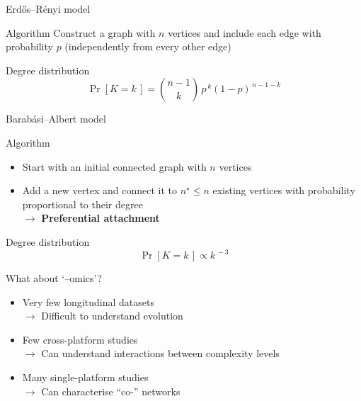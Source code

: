 \begin{frame}{Erdős--Rényi model}
    \begin{block}{Algorithm}
        Construct a graph with $n$ vertices and include each edge with
        probability $p$ (independently from every other edge)
    \end{block}
    \vfill\pause
    \begin{block}{Degree distribution}
        \[
            \Pr\left[ K = k \,\right] = \binom{n-1}{k} \, p^{\,k} \left( 1-p \right)^{\,n-1-k}
        \]
    \end{block}
\end{frame}

\begin{frame}{Barabási--Albert model}
    \begin{block}{Algorithm}
        \begin{itemize}
            \item Start with an initial connected graph with $n$ vertices
            \item Add a new vertex and connect it to $n^{\star} \leq n$ existing
                  vertices with probability proportional to their degree \\
                  $\rightarrow$ \textbf{Preferential attachment}
        \end{itemize}
    \end{block}
    \vfill\pause
    \begin{block}{Degree distribution}
        \[
            \Pr\left[ K = k \,\right] \propto k^{\,-3}
        \]
    \end{block}
\end{frame}

\begin{frame}{What about `--omics'?}
    \begin{itemize}
        \setlength{\itemsep}{\bigskipamount}
        \item Very few longitudinal datasets \\
              $\rightarrow$ Difficult to understand evolution
        \item Few cross\hyp{}platform studies \\
              $\rightarrow$ Can understand interactions between complexity
                            levels
        \item Many single\hyp{}platform studies \\
              $\rightarrow$ Can characterise ``co\hyp{}'' networks
    \end{itemize}
\end{frame}



